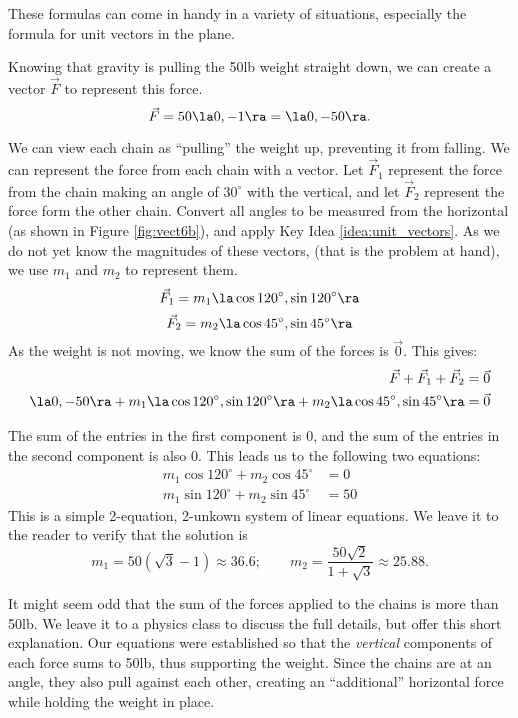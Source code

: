 These formulas can come in handy in a variety of situations, especially the formula for unit vectors in the plane.\\



{Knowing that gravity is pulling the 50lb weight straight down, we can create a vector $\vec F$ to represent this force. 
$$\vec F = 50\la 0,-1\ra = \la 0,-50\ra.$$

We can view each chain as ``pulling'' the weight up, preventing it from falling. We can represent the force from each chain with a vector. Let $\vec F_1$ represent the force from the chain making an angle of $30^\circ$ with the vertical, and let $\vec F_2$ represent the force form the other chain. Convert all angles to be measured from the horizontal (as shown in Figure \ref{fig:vect6b}), and apply Key Idea \ref{idea:unit_vectors}. As we do not yet know the magnitudes of these vectors, (that is the problem at hand), we use $m_1$ and $m_2$ to represent them.
$$\vec F_1 = m_1\la \cos 120^\circ,\sin120^\circ\ra$$
$$\vec F_2 = m_2\la \cos 45^\circ,\sin45^\circ\ra$$
As the weight is not moving, we know the sum of the forces is $\vec 0$. This gives:
\begin{align*}
\vec F + \vec F_1 + \vec F_2 & = \vec 0\\
\la 0,-50\ra + m_1\la \cos 120^\circ,\sin120^\circ\ra + m_2\la \cos 45^\circ,\sin45^\circ\ra &=\vec 0
\end{align*}

The sum of the entries in the first component is 0, and the sum of the entries in the second component is also 0. This leads us to the following two equations:
\begin{align*}
m_1\cos120^\circ + m_2\cos45^\circ &=0 \\
m_1\sin120^\circ + m_2\sin45^\circ &=50
\end{align*}
This is a simple 2-equation, 2-unkown system of linear equations. We leave it to the reader to verify that the solution is 
$$m_1=50(\sqrt{3}-1) \approx 36.6;\qquad m_2=\frac{50\sqrt{2}}{1+\sqrt{3}} \approx 25.88.$$

It might seem odd that the sum of the forces applied to the chains is more than 50lb. We leave it to a physics class to discuss the full details, but offer this short explanation. Our equations were established so that the \textit{vertical} components of each force sums to 50lb, thus supporting the weight. Since the chains are at an angle, they also pull against each other, creating an ``additional'' horizontal force while holding the weight in place.
}\\

